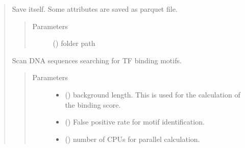 \documentclass[letterpaper,10pt,english]{sphinxmanual}
\begin{document}
\begin{quote}
\begin{fulllineitems}

\begin{fulllineitems}
\label{\detokenize{modules/celloracle.motif_analysis:celloracle.motif_analysis.TFinfo.save_as_parquet}}
Save itself. Some attributes are saved as parquet file.
\begin{quote}\begin{description}
\item[{Parameters}] \leavevmode
{} () \textendash{} folder path

\end{description}\end{quote}

\end{fulllineitems}


\begin{fulllineitems}
\label{\detokenize{modules/celloracle.motif_analysis:celloracle.motif_analysis.TFinfo.scan}}
Scan DNA sequences searching for TF binding motifs.
\begin{quote}\begin{description}
\item[{Parameters}] \leavevmode\begin{itemize}
\item {} 
 () \textendash{} background length. This is used for the calculation of the binding score.

\item {} 
 () \textendash{} False positive rate for motif identification.

\item {} 
 () \textendash{} number of CPUs for parallel calculation.


\end{itemize}
\end{description}
\end{quote}
\end{fulllineitems}
\end{fulllineitems}
\end{quote}
\end{document}
